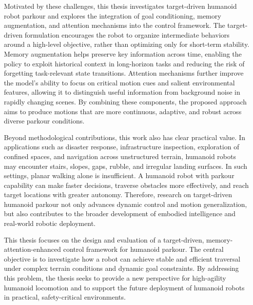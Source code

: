 Motivated by these challenges, this thesis investigates target-driven humanoid robot parkour and explores the integration of goal conditioning, memory augmentation, and attention mechanisms into the control framework. The target-driven formulation encourages the robot to organize intermediate behaviors around a high-level objective, rather than optimizing only for short-term stability. Memory augmentation helps preserve key information across time, enabling the policy to exploit historical context in long-horizon tasks and reducing the risk of forgetting task-relevant state transitions. Attention mechanisms further improve the model's ability to focus on critical motion cues and salient environmental features, allowing it to distinguish useful information from background noise in rapidly changing scenes. By combining these components, the proposed approach aims to produce motions that are more continuous, adaptive, and robust across diverse parkour conditions.

Beyond methodological contributions, this work also has clear practical value. In applications such as disaster response, infrastructure inspection, exploration of confined spaces, and navigation across unstructured terrain, humanoid robots may encounter stairs, slopes, gaps, rubble, and irregular landing surfaces. In such settings, planar walking alone is insufficient. A humanoid robot with parkour capability can make faster decisions, traverse obstacles more effectively, and reach target locations with greater autonomy. Therefore, research on target-driven humanoid parkour not only advances dynamic control and motion generalization, but also contributes to the broader development of embodied intelligence and real-world robotic deployment.

This thesis focuses on the design and evaluation of a target-driven, memory-attention-enhanced control framework for humanoid parkour. The central objective is to investigate how a robot can achieve stable and efficient traversal under complex terrain conditions and dynamic goal constraints. By addressing this problem, the thesis seeks to provide a new perspective for high-agility humanoid locomotion and to support the future deployment of humanoid robots in practical, safety-critical environments.